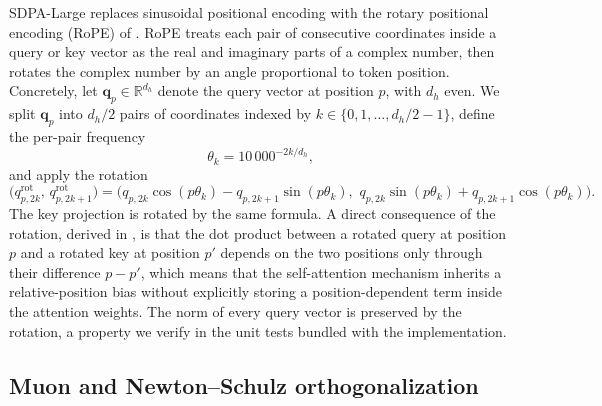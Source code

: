 SDPA-Large replaces sinusoidal positional encoding with the rotary positional encoding (RoPE) of \citet{su2021roformer}. RoPE treats each pair of consecutive coordinates inside a query or key vector as the real and imaginary parts of a complex number, then rotates the complex number by an angle proportional to token position. Concretely, let $\mathbf{q}_p \in \mathbb{R}^{d_h}$ denote the query vector at position $p$, with $d_h$ even. We split $\mathbf{q}_p$ into $d_h / 2$ pairs of coordinates indexed by $k \in \{0, 1, \ldots, d_h/2 - 1\}$, define the per-pair frequency
\begin{equation}
\theta_k = 10\,000^{-2k/d_h},
\end{equation}
and apply the rotation
\begin{equation}
\label{eq:rope}
\big(q^{\text{rot}}_{p, 2k},\, q^{\text{rot}}_{p, 2k+1}\big) = \big(q_{p, 2k} \cos(p \theta_k) - q_{p, 2k+1} \sin(p \theta_k),\,\, q_{p, 2k} \sin(p \theta_k) + q_{p, 2k+1} \cos(p \theta_k)\big).
\end{equation}
The key projection is rotated by the same formula. A direct consequence of the rotation, derived in \citet{su2021roformer}, is that the dot product between a rotated query at position $p$ and a rotated key at position $p'$ depends on the two positions only through their difference $p - p'$, which means that the self-attention mechanism inherits a relative-position bias without explicitly storing a position-dependent term inside the attention weights. The norm of every query vector is preserved by the rotation, a property we verify in the unit tests bundled with the implementation.

\subsection{Muon and Newton--Schulz orthogonalization}

